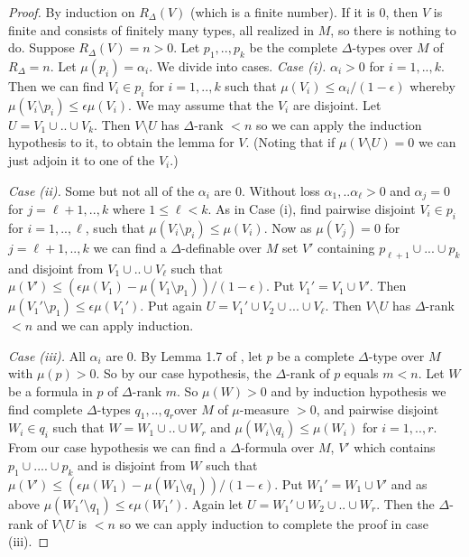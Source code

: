 \documentclass[12pt]{article}
\begin{document}
\begin{proof} By induction on $R_{\Delta}(V)$ (which is a finite number). If it is $0$, then $V$ is finite and consists of finitely many types, all  realized in $M$, so there is nothing to do. Suppose $R_{\Delta}(V) = n > 0$. Let $p_{1},..,p_{k}$ be the complete $\Delta$-types over $M$ of $R_{\Delta} = n$.  Let $\mu(p_{i}) = \alpha_{i}$. We divide into cases.
\newline
{\em Case (i).}  $\alpha_{i} > 0$ for $i=1,..,k$. 
\newline
Then we can find $V_{i}\in p_{i}$ for $i=1,..,k$ such that $\mu(V_{i}) \leq \alpha_{i}/(1-\epsilon)$ whereby $\mu(V_{i}\setminus p_{i})\leq \epsilon\mu(V_{i})$.  We may assume that the $V_{i}$ are disjoint. Let $U = V_{1}\cup ..\cup V_{k}$. Then $V\setminus U$ has $\Delta$-rank $< n$ so we can apply the induction hypothesis to it, to obtain the lemma for $V$.  (Noting that if $\mu(V\setminus U) = 0$ we can just adjoin it to one of the $V_{i}$.) 

\vspace{2mm}
\noindent
{\em Case (ii).} Some but not all of the $\alpha_{i}$ are $0$.
\newline
Without loss $\alpha_{1},..\alpha_{\ell} > 0$ and $\alpha_{j} = 0$ for $j = \ell + 1,.., k$ where $1\leq \ell < k$.   As in Case (i), find pairwise disjoint $V_{i}\in p_{i}$ for $i = 1,.., \ell$, such that $\mu(V_{i}\setminus p_{i}) \leq \mu(V_{i})$.  Now as $\mu(V_{j}) = 0$ for $j=\ell+1,..,k$ we can find a $\Delta$-definable over $M$ set $V'$ containing $p_{\ell+1}\cup ... 
\cup p_{k}$  and disjoint from $V_{1}\cup ..\cup V_{\ell}$ such that 
$\mu(V') \leq (\epsilon\mu(V_{1})-\mu(V_{1}\setminus p_{1}))/(1-\epsilon)$.  Put $V_{1}' = V_{1}\cup V'$. Then $\mu(V_{1}'\setminus p_{1}) \leq \epsilon\mu(V_{1}')$. Put again $U = 
V_{1}'\cup V_{2} \cup...\cup V_{\ell}$. Then $V\setminus U$ has $\Delta$-rank $< n$ and we can apply induction. 

\vspace{2mm}
\noindent
{\em Case (iii).}  All $\alpha_{i}$ are $0$. 
\newline
By  Lemma 1.7 of \cite{Keisler}, let $p$  be a complete $\Delta$-type over $M$ with $\mu(p) > 0$. So by our case hypothesis, the $\Delta$-rank of $p$ equals $m < n$. Let $W$ be a formula 
in $p$ of $\Delta$-rank $m$.  So $\mu(W) > 0$ and by induction hypothesis we find complete $\Delta$-types $q_{1},..,q_{r}$over $M$ of $\mu$-measure $> 0$,  and pairwise disjoint $W_{i}\in 
q_{i}$ such that $W = W_{1}\cup .. \cup W_{r}$ and $\mu(W_{i}\setminus q_{i}) \leq \mu(W_{i})$ for $i=1,..,r$.  From our case hypothesis we can  find a $\Delta$-formula over $M$, $V'$ 
which contains $p_{1}\cup ....\cup p_{k}$ and is disjoint from $W$ such that   $\mu(V') \leq (\epsilon\mu(W_{1})-\mu(W_{1}\setminus q_{1}))/(1-\epsilon)$.  Put $W_{1}' = W_{1}\cup V'$ and as above
$\mu(W_{1}'\setminus q_{1}) \leq \epsilon\mu(W_{1}')$.  Again let $U = W_{1}'\cup W_{2} \cup .. \cup W_{r}$. Then the $\Delta$-rank of $V\setminus U$ is $< n$ so we can apply induction to complete the proof in case (iii). 

\end{proof}
\end{document}
